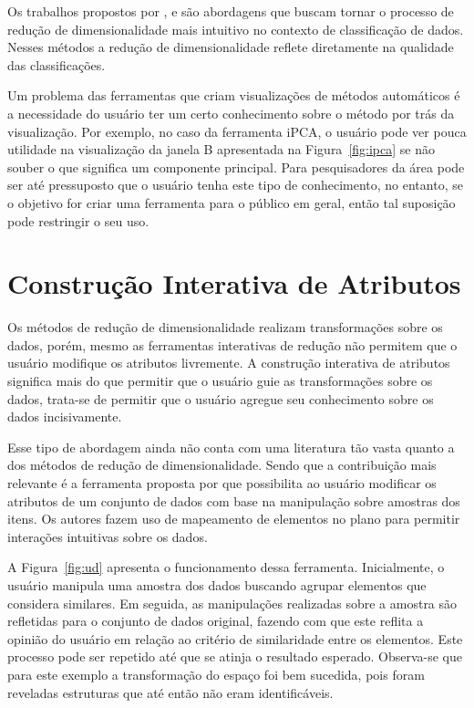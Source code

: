 Os trabalhos propostos por \citet{Zhang2006}, \citet{Choo2010}
e \citet{Paiva2012} são abordagens que buscam tornar o
processo de redução de dimensionalidade mais intuitivo no
contexto de classificação de dados. Nesses métodos a redução
de dimensionalidade reflete diretamente na qualidade das
classificações. 

Um problema das ferramentas que criam visualizações de métodos
automáticos é a necessidade do usuário ter um certo
conhecimento sobre o método por trás da visualização. Por
exemplo, no caso da ferramenta iPCA, o usuário pode ver
pouca utilidade na visualização da janela B apresentada na
Figura~\ref{fig:ipca} se não souber o que significa um
componente principal. Para pesquisadores da área pode ser
até pressuposto que o usuário tenha este tipo de
conhecimento, no entanto, se o objetivo for criar uma
ferramenta para o público em geral, então tal suposição pode
restringir o seu uso.

\section{Construção Interativa de Atributos}\label{sec:tr}

Os métodos de redução de dimensionalidade realizam
transformações sobre os dados, porém, mesmo as ferramentas
interativas de redução não permitem que o usuário modifique
os atributos livremente. A construção interativa de
atributos significa mais do que permitir que o usuário guie
as transformações sobre os dados, trata-se de permitir que o
usuário agregue seu conhecimento sobre os dados
incisivamente.


Esse tipo de abordagem ainda não conta com uma literatura
tão vasta quanto a dos métodos de redução de
dimensionalidade. Sendo que a contribuição mais relevante é a
ferramenta proposta por \citet{Gladys2013} que possibilita ao
usuário modificar os atributos de um conjunto de dados com
base na manipulação sobre amostras dos itens. Os autores
fazem uso de mapeamento de elementos no plano para permitir
interações intuitivas sobre os dados. 

A Figura~\ref{fig:ud} apresenta  o funcionamento dessa
ferramenta. Inicialmente, o usuário manipula uma amostra dos
dados buscando  agrupar elementos que considera similares.
Em seguida, as manipulações realizadas sobre a amostra são
refletidas para o conjunto de dados original, fazendo com
que este reflita a opinião do usuário em relação ao critério
de similaridade entre os elementos. Este processo pode ser
repetido até que se atinja o resultado esperado.  Observa-se
que para este exemplo a transformação do espaço foi bem
sucedida, pois foram reveladas estruturas que até então não
eram identificáveis.

